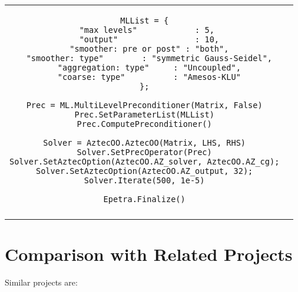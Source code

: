 \documentclass[10pt,relax]{SANDreport}
\begin{document}
\begin{sidewaystable}
\begin{tabular}{| c  | c|}
\begin{minipage}{10cm}
\begin{verbatim}
MLList = {
  "max levels"            : 5, 
  "output"                : 10,
  "smoother: pre or post" : "both",
  "smoother: type"        : "symmetric Gauss-Seidel",
  "aggregation: type"     : "Uncoupled",
  "coarse: type"          : "Amesos-KLU"
};

Prec = ML.MultiLevelPreconditioner(Matrix, False)
Prec.SetParameterList(MLList)
Prec.ComputePreconditioner()

Solver = AztecOO.AztecOO(Matrix, LHS, RHS)
Solver.SetPrecOperator(Prec)
Solver.SetAztecOption(AztecOO.AZ_solver, AztecOO.AZ_cg);
Solver.SetAztecOption(AztecOO.AZ_output, 32);
Solver.Iterate(500, 1e-5)

Epetra.Finalize()
\end{verbatim}
\end{minipage}
\\
&  \\
\hline
\end{tabular}
\end{sidewaystable}

\section{Comparison with Related Projects}
\label{sec:related}

Similar projects are:
\end{document}
